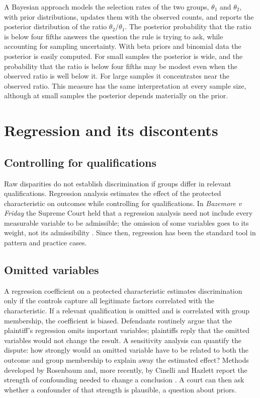 A Bayesian approach models the selection rates of the two groups, $\theta_1$ and $\theta_2$, with prior distributions, updates them with the observed counts, and reports the posterior distribution of the ratio $\theta_2/\theta_1$. The posterior probability that the ratio is below four fifths answers the question the rule is trying to ask, while accounting for sampling uncertainty. With beta priors and binomial data the posterior is easily computed. For small samples the posterior is wide, and the probability that the ratio is below four fifths may be modest even when the observed ratio is well below it. For large samples it concentrates near the observed ratio. This measure has the same interpretation at every sample size, although at small samples the posterior depends materially on the prior.

\section{Regression and its discontents}

\subsection{Controlling for qualifications}

Raw disparities do not establish discrimination if groups differ in relevant qualifications. Regression analysis estimates the effect of the protected characteristic on outcomes while controlling for qualifications. In \emph{Bazemore v Friday} the Supreme Court held that a regression analysis need not include every measurable variable to be admissible; the omission of some variables goes to its weight, not its admissibility \citep{bazemore1986}. Since then, regression has been the standard tool in pattern and practice cases.

\subsection{Omitted variables}

A regression coefficient on a protected characteristic estimates discrimination only if the controls capture all legitimate factors correlated with the characteristic. If a relevant qualification is omitted and is correlated with group membership, the coefficient is biased. Defendants routinely argue that the plaintiff's regression omits important variables; plaintiffs reply that the omitted variables would not change the result. A sensitivity analysis can quantify the dispute: how strongly would an omitted variable have to be related to both the outcome and group membership to explain away the estimated effect? Methods developed by Rosenbaum and, more recently, by Cinelli and Hazlett report the strength of confounding needed to change a conclusion \citep{cinelli2020}. A court can then ask whether a confounder of that strength is plausible, a question about priors.

